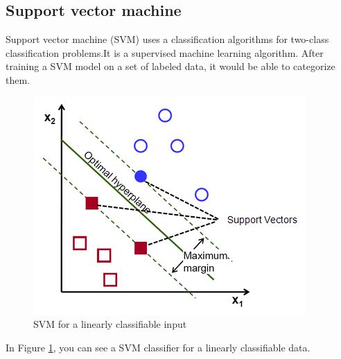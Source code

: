 \subsection{Support vector machine}
Support vector machine (SVM)  uses a classification algorithms for two-class classification problems.It is a supervised machine learning algorithm. After training a SVM model on a set of labeled data, it would be able to categorize them.

\begin{figure}[ht]
    \centering
    \includegraphics{Pictures/SVM_margin.png}
    \caption{SVM for a linearly classifiable input}
    \label{fig:svm}
\end{figure}
In Figure \ref{fig:svm}, you can see a SVM classifier for a linearly classifiable data.

